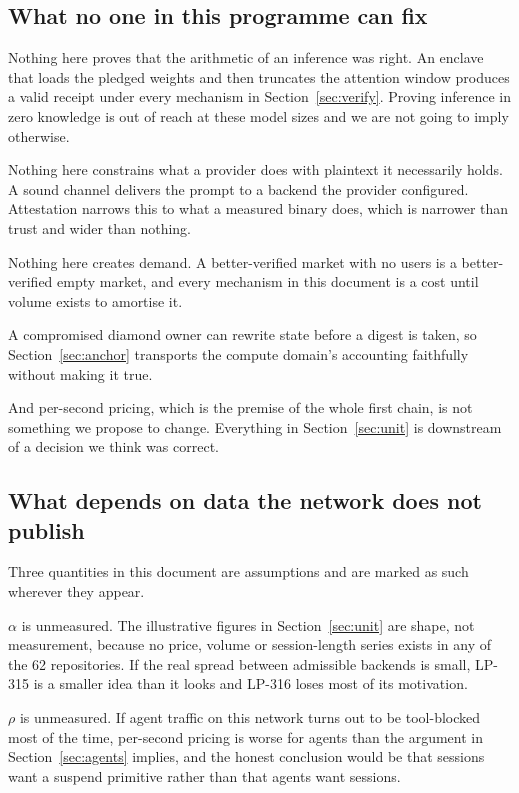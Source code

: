 \documentclass[11pt,a4paper]{article}
\begin{document}
\subsection{What no one in this programme can fix}

Nothing here proves that the arithmetic of an inference was right. An enclave
that loads the pledged weights and then truncates the attention window produces
a valid receipt under every mechanism in Section~\ref{sec:verify}. Proving
inference in zero knowledge is out of reach at these model sizes and we are not
going to imply otherwise.

Nothing here constrains what a provider does with plaintext it necessarily
holds. A sound channel delivers the prompt to a backend the provider
configured. Attestation narrows this to what a measured binary does, which is
narrower than trust and wider than nothing.

Nothing here creates demand. A better-verified market with no users is a
better-verified empty market, and every mechanism in this document is a cost
until volume exists to amortise it.

A compromised diamond owner can rewrite state before a digest is taken, so
Section~\ref{sec:anchor} transports the compute domain's accounting faithfully
without making it true.

And per-second pricing, which is the premise of the whole first chain, is not
something we propose to change. Everything in Section~\ref{sec:unit} is
downstream of a decision we think was correct.

\subsection{What depends on data the network does not publish}

Three quantities in this document are assumptions and are marked as such
wherever they appear.

$\alpha$ is unmeasured. The illustrative figures in Section~\ref{sec:unit} are
shape, not measurement, because no price, volume or session-length series exists
in any of the 62 repositories. If the real spread between admissible backends is
small, LP-315 is a smaller idea than it looks and LP-316 loses most of its
motivation.

$\rho$ is unmeasured. If agent traffic on this network turns out to be
tool-blocked most of the time, per-second pricing is worse for agents than the
argument in Section~\ref{sec:agents} implies, and the honest conclusion would be
that sessions want a suspend primitive rather than that agents want sessions.
\end{document}
